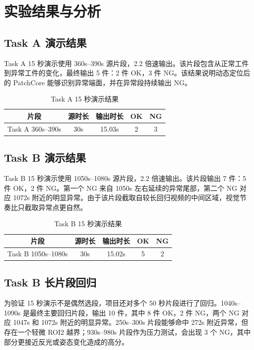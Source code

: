 \documentclass[12pt,hyperref,a4paper,UTF8,fontset=fandol]{ctexart}
\begin{document}
\newpage
\section{实验结果与分析}

\subsection{Task A 演示结果}

Task A 15 秒演示使用 360s--390s 源片段，2.2 倍速输出。该片段包含从正常工件到异常工件的变化，最终输出 5 件：2 件 OK，3 件 NG。该结果说明动态定位后的 PatchCore 能够识别异常端面，并在异常段持续输出 NG。

\begin{table}[H]
    \centering
    \begin{tabular}{ccccc}
        \toprule
        片段 & 源时长 & 输出时长 & OK & NG \\
        \midrule
        Task A 360s--390s & 30s & 15.03s & 2 & 3 \\
        \bottomrule
    \end{tabular}
    \caption{Task A 15 秒演示结果}
\end{table}

\subsection{Task B 演示结果}

Task B 15 秒演示使用 1050s--1080s 源片段，2.2 倍速输出。该片段输出 7 件：5 件 OK，2 件 NG。第一个 NG 来自 1050s 左右延续的异常尾部，第二个 NG 对应 1072s 附近的明显异常。由于该片段截取自较长回归视频的中间区域，视觉节奏比只截取异常点更自然。

\begin{table}[H]
    \centering
    \begin{tabular}{ccccc}
        \toprule
        片段 & 源时长 & 输出时长 & OK & NG \\
        \midrule
        Task B 1050s--1080s & 30s & 15.02s & 5 & 2 \\
        \bottomrule
    \end{tabular}
    \caption{Task B 15 秒演示结果}
\end{table}

\subsection{Task B 长片段回归}

为验证 15 秒演示不是偶然选段，项目还对多个 50 秒片段进行了回归。1040s--1090s 是最终主要回归片段，输出 10 件，其中 8 件 OK，2 件 NG，两个 NG 对应 1047s 和 1072s 附近的明显异常。250s--300s 片段能够命中 272s 附近异常，但存在一个轻微 ROI2 越界；930s--980s 片段作为压力测试，会出现 3 个 NG，其中部分更接近反光或姿态变化造成的高分。
\end{document}
